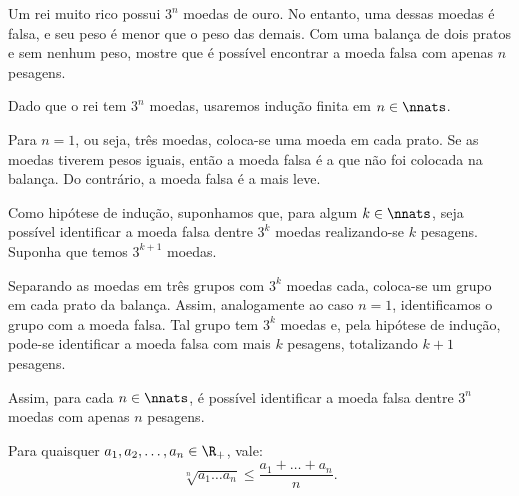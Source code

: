 \begin{example}
Um rei muito rico possui $3^n$ moedas de ouro. No entanto, uma dessas moedas é falsa, e seu peso é menor que o peso das demais. Com uma balança de dois pratos e sem nenhum peso, mostre que é possível encontrar a moeda falsa com apenas $n$ pesagens.
\end{example}

\begin{solution}
Dado que o rei tem $3^n$ moedas, usaremos indução finita em $n \in \nnats$. 

Para $n=1$, ou seja, três moedas, coloca-se uma moeda em cada prato. Se as moedas tiverem pesos iguais, então a moeda falsa é a que não foi colocada na balança. Do contrário, a moeda falsa é a mais leve.

Como hipótese de indução, suponhamos que, para algum $k \in \nnats$, seja possível identificar a moeda falsa dentre $3^k$ moedas realizando-se $k$ pesagens. Suponha que temos $3^{k+1}$ moedas. 

Separando as moedas em três grupos com $3^k$ moedas cada, coloca-se um grupo em cada prato da balança. Assim, analogamente ao caso $n = 1$, identificamos o grupo com a moeda falsa. Tal grupo tem $3^k$ moedas e, pela hipótese de indução, pode-se identificar a moeda falsa com mais $k$  pesagens, totalizando $k+1$ pesagens.

Assim, para cada $n \in \nnats$, é possível identificar a moeda falsa dentre $3^n$ moedas com apenas $n$ pesagens.
\end{solution}

\begin{theorem}
Para quaisquer $a_1, a_2, \dots , a_n \in \R_+$, vale:
%
\begin{equation*}
    \sqrt[n]{a_1\dots a_n} \le \frac {a_1 + \dots + a_n} n.
\end{equation*}
\end{theorem}

